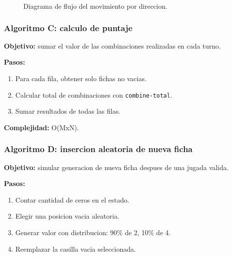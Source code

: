\documentclass[12pt,a4paper]{article}
\begin{document}
\begin{figure}[H]
    \caption{Diagrama de flujo del movimiento por direccion.}
\end{figure}

\subsubsection*{Algoritmo C: calculo de puntaje}
\textbf{Objetivo:} sumar el valor de las combinaciones realizadas en cada turno.

\textbf{Pasos:}
\begin{enumerate}
    \item Para cada fila, obtener solo fichas no vacias.
    \item Calcular total de combinaciones con \texttt{combine-total}.
    \item Sumar resultados de todas las filas.
\end{enumerate}

\textbf{Complejidad:} O(MxN).

\subsubsection*{Algoritmo D: insercion aleatoria de nueva ficha}
\textbf{Objetivo:} simular generacion de nueva ficha despues de una jugada valida.

\textbf{Pasos:}
\begin{enumerate}
    \item Contar cantidad de ceros en el estado.
    \item Elegir una posicion vacia aleatoria.
    \item Generar valor con distribucion: 90\% de 2, 10\% de 4.
    \item Reemplazar la casilla vacia seleccionada.
\end{enumerate}
\end{document}
